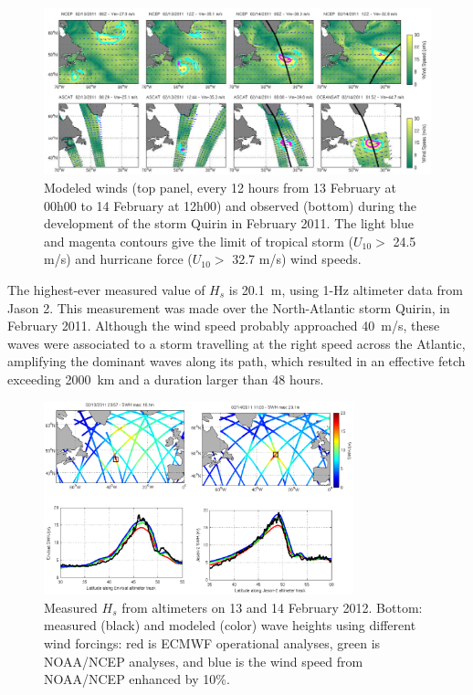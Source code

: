 \begin{figure}[htb]
\centerline{\includegraphics[width=1.0\textwidth]{FIGS_CH_STORMS/Quirin_winds.pdf}}
  \caption{Modeled winds (top panel, every 12 hours from 13 February at 00h00 to  14 February at  12h00) and  observed  (bottom) 
  during the development of the storm Quirin in February 2011. The light blue and magenta contours  give the 
  limit of tropical storm  ($U_{10}>$  24.5 m/s) and hurricane force ($U_{10}>$  32.7 m/s) wind speeds.}
  \label{fig:Quirin_winds}
\end{figure}
The highest-ever measured value of $H_s$ is  20.1~m, using 1-Hz altimeter data from Jason 2. This measurement was made over the North-Atlantic storm 
Quirin, in February 2011. Although the wind speed probably approached 40~m/s, these waves were associated to a storm travelling at the right 
speed across the Atlantic, amplifying the dominant waves along its path, which resulted in an effective fetch exceeding 2000~km and a duration 
larger than 48 hours. 


\begin{figure}[htb]
\centerline{\includegraphics[width=0.8\textwidth]{FIGS_CH_STORMS/Quirin_waves.pdf}}
  \caption{Measured $H_s$ from altimeters on 13 and 14 February 2012. Bottom: measured (black) and modeled  (color) wave heights using 
  different wind forcings: red is ECMWF operational analyses, green is NOAA/NCEP analyses, and blue is the wind speed from NOAA/NCEP enhanced by 10\%.}
  \label{fig:Quirin_waves}
\end{figure}

